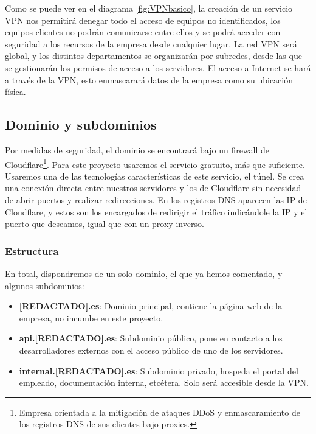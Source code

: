 Como se puede ver en el diagrama \ref{fig:VPNbasico}, la creación de un servicio VPN nos permitirá denegar todo el acceso de equipos no identificados, los equipos clientes no podrán comunicarse entre ellos y se podrá acceder con seguridad a los recursos de la empresa desde cualquier lugar. La red VPN será global, y los distintos departamentos se organizarán por subredes, desde las que se gestionarán los permisos de acceso a los servidores. El acceso a Internet se hará a través de la VPN, esto enmascarará datos de la empresa como su ubicación física.

\subsection{Dominio y subdominios}
Por medidas de seguridad, el dominio se encontrará bajo un firewall de Cloudflare\footnote{Empresa orientada a la mitigación de ataques DDoS y enmascaramiento de los registros DNS de sus clientes bajo proxies.}. Para este proyecto usaremos el servicio gratuito, más que suficiente. Usaremos una de las tecnologías características de este servicio, el túnel. Se crea una conexión directa entre nuestros servidores y los de Cloudflare sin necesidad de abrir puertos y realizar redirecciones. En los registros DNS aparecen las IP de Cloudflare, y estos son los encargados de redirigir el tráfico indicándole la IP y el puerto que deseamos, igual que con un proxy inverso\cite{CloudflareTunnel}.

\subsubsection{Estructura}
En total, dispondremos de un solo dominio, el que ya hemos comentado, y algunos subdominios:
\begin{itemize}
    \item \textbf{[REDACTADO].es}: Dominio principal, contiene la página web de la empresa, no incumbe en este proyecto.
    \item \textbf{api.[REDACTADO].es}: Subdominio público, pone en contacto a los desarrolladores externos con el acceso público de uno de los servidores.
    \item \textbf{internal.[REDACTADO].es}: Subdominio privado, hospeda el portal del empleado, documentación interna, etcétera. Solo será accesible desde la VPN.
\end{itemize}
